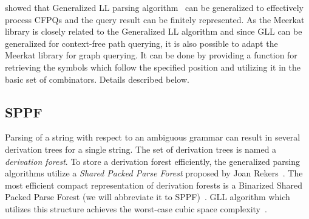\cite{GrigorevR16} showed that Generalized LL parsing algorithm~\cite{scott2010gll} can be generalized to effectively process CFPQs and the query result can be finitely represented.
As the Meerkat library is closely related to the Generalized LL algorithm and since GLL can be generalized for context-free path querying, it is also possible to adapt the Meerkat library for graph querying. 
It can be done by providing a function for retrieving the symbols which follow the specified position and utilizing it in the basic set of combinators.
Details described below.





\subsection{SPPF}

Parsing of a string with respect to an ambiguous grammar can result in several derivation trees for a single string. 
The set of derivation trees is named a \emph{derivation forest}. 
To store a derivation forest efficiently, the generalized parsing algorithms utilize a \emph{Shared Packed Parse Forest} proposed by Joan Rekers~\cite{SPPF}. 
The most efficient compact representation of derivation forests is a Binarized Shared Packed Parse Forest (we will abbreviate it to SPPF)~\cite{brnglr}.
GLL algorithm which utilizes this structure achieves the worst-case cubic space complexity~\cite{gllParsingTree}.


